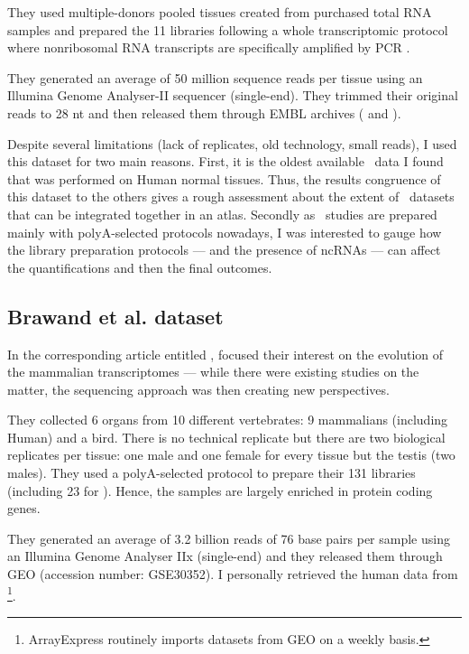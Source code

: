 They used multiple-donors pooled tissues created from purchased total \gls{RNA}
samples and prepared the 11 libraries following a whole transcriptomic protocol
where nonribosomal \gls{RNA} transcripts are
specifically amplified by \gls{PCR} .

They generated an average of 50 million sequence reads per tissue
using an Illumina Genome Analyser-II sequencer (single-end).
They trimmed their original reads to 28 \gls{nt}
and then released them through EMBL archives (
and ).

Despite several limitations (lack of replicates, old technology, small reads),
I used this dataset for two main reasons. First, it is the oldest available
\Rnaseq\ data I found that was performed on Human normal tissues. Thus, the
results congruence of this dataset to the others gives a rough assessment about
the extent of \Rnaseq\ datasets that can be integrated together in an atlas.
Secondly as \Rnaseq\ studies are prepared mainly with polyA-selected protocols
nowadays, I was interested to gauge how the library preparation
protocols --- and the presence of \glspl{ncRNA} --- can affect the
quantifications and then the final outcomes.


\subsection{Brawand et al. dataset}

In the corresponding article entitled ,
\citet{VTpaper} focused their interest on the
evolution of the mammalian transcriptomes --- while there were existing studies
on the matter, the sequencing approach was then creating new perspectives.

They collected 6 organs from 10 different vertebrates:
9 mammalians (including Human) and a bird. There is no technical replicate
but there are two biological replicates per tissue:
one male and one female for every tissue but the testis (two males).
They used a polyA-selected protocol to prepare their 131 libraries (including 23
for ).
Hence, the samples are largely enriched in protein coding genes.

They generated an average of 3.2 billion reads of 76 base pairs per sample
using an Illumina Genome Analyser IIx (single-end) and they released them
through \gls{GEO} (accession number: GSE30352).
I personally retrieved the human data from
\footnote{ArrayExpress routinely imports
datasets from \gls{GEO} on a weekly basis.}.


